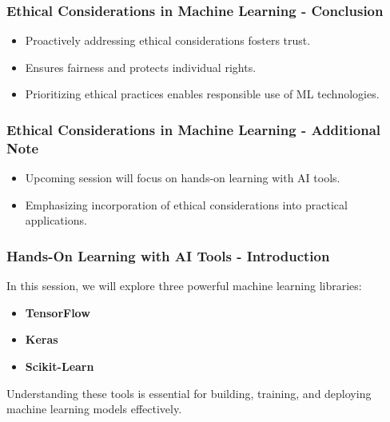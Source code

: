 \documentclass{beamer}
\begin{document}
\begin{frame}[fragile]
    \frametitle{Ethical Considerations in Machine Learning - Conclusion}
    \begin{itemize}
        \item Proactively addressing ethical considerations fosters trust.
        \item Ensures fairness and protects individual rights.
        \item Prioritizing ethical practices enables responsible use of ML technologies.
    \end{itemize}
\end{frame}

\begin{frame}[fragile]
    \frametitle{Ethical Considerations in Machine Learning - Additional Note}
    \begin{itemize}
        \item Upcoming session will focus on hands-on learning with AI tools.
        \item Emphasizing incorporation of ethical considerations into practical applications.
    \end{itemize}
\end{frame}

\begin{frame}[fragile]
    \frametitle{Hands-On Learning with AI Tools - Introduction}
    In this session, we will explore three powerful machine learning libraries:
    \begin{itemize}
        \item \textbf{TensorFlow}
        \item \textbf{Keras}
        \item \textbf{Scikit-Learn}
    \end{itemize}
    Understanding these tools is essential for building, training, and deploying machine learning models effectively.
\end{frame}
\end{document}
